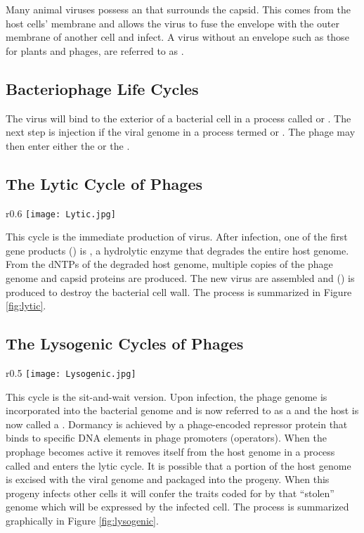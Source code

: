 \documentclass[../Bio_chemistryReview.tex]{subfiles}
\begin{document}
Many animal viruses possess an  that surrounds the capsid.
This comes from the host cells' membrane and allows the virus to fuse the
envelope with the outer membrane of another cell and infect. A virus without an
envelope such as those for plants and phages, are referred to as .

\subsection{Bacteriophage Life Cycles}
The virus will bind to the exterior of a bacterial cell in a process called
 or . The next step is injection if the
viral genome in a process termed  or . The
phage may then enter either the  or the .
\\
\subsection{The Lytic Cycle of Phages}
\begin{wrapfigure}[17]{r}{0.6\textwidth}
    \centering
    \vspace{-10pt}
    \texttt{[image: Lytic.jpg]}
    \caption{The Lytic Cycle}
    \label{fig:lytic}
\end{wrapfigure}
This cycle is the immediate production of virus. After infection, one of the
first gene products () is , a hydrolytic
enzyme that degrades the entire host genome. From the dNTPs of the degraded host
genome, multiple copies of the phage genome and capsid proteins are produced.
The new virus are assembled and  () is
produced to destroy the bacterial cell wall. The process is summarized in Figure
\ref{fig:lytic}.

\subsection{The Lysogenic Cycles of Phages}
\begin{wrapfigure}{r}{0.5\textwidth}
    \centering
    \vspace{-10pt}
    \texttt{[image: Lysogenic.jpg]}
    \caption{The Lysogenic Cycle}
    \label{fig:lysogenic}
\end{wrapfigure}
This cycle is the sit-and-wait version. Upon infection, the phage genome is
incorporated into the bacterial genome and is now referred to as a
 and the host is now called a . Dormancy is
achieved by a phage-encoded repressor protein that binds to specific DNA
elements in phage promoters (operators). When the prophage becomes active it
removes itself from the host genome in a process called  and
enters the lytic cycle. It is possible that a portion of the host genome is
excised with the viral genome and packaged into the progeny. When this progeny
infects other cells it will confer the traits coded for by that ``stolen''
genome which will be expressed by the infected cell. The process is summarized
graphically in Figure \ref{fig:lysogenic}.
\end{document}
